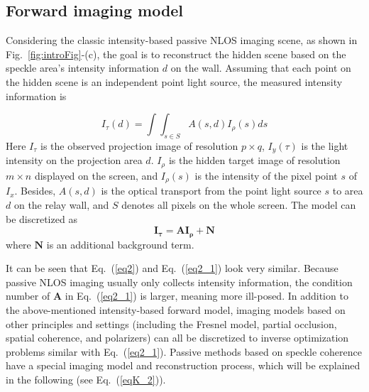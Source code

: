 \subsection{Forward imaging model}
Considering the classic intensity-based passive NLOS imaging scene, as shown in Fig.~\ref{fig:introFig}-(c), the goal is to reconstruct the hidden scene based on the speckle area's intensity information $d$ on the wall. Assuming that each point on the hidden scene is an independent point light source, the measured intensity information is

\begin{equation}
   I_{\tau}(d)=\int\int_{s\in S} A(s,d)I_{\rho}(s)ds
\end{equation}
Here $ I_ {\tau}$ is the observed projection image of resolution $p\times q$, $I_{y}(\tau)$ is the light intensity on the projection area $d$. $ I_ {\rho}$ is the hidden target image of resolution $m \times n$ displayed on the screen, and $I_{\rho}(s)$ is the intensity of the pixel point $s$ of $I_x$. Besides, $A(s,d)$ is the optical transport from the point light source $s$ to area $d$ on the relay wall, and $S$ denotes all pixels on the whole screen. The model can be discretized as
\begin{equation}
   \mathbf{I_{\tau}} = \mathbf{A}\mathbf{I_{\rho}} + \mathbf{N}
   \label{eq2_1}
\end{equation}
where $\mathbf{N}$ is an additional background term.

It can be seen that Eq.~(\ref{eq2}) and Eq.~(\ref{eq2_1}) look very similar. Because passive NLOS imaging usually only collects intensity information, the condition number of $\mathbf{A}$ in Eq.~(\ref{eq2_1}) is larger, meaning more ill-posed. 
In addition to the above-mentioned intensity-based forward model, imaging models based on other principles and settings (including the Fresnel model\cite{beckusMultiModalNonLineofSightPassive2019}, partial occlusion\cite{saundersComputationalPeriscopyOrdinary2019,seidelTwoDimensionalNonLineofSightScene2020}, spatial coherence\cite{batarsehPassiveSensingCorner2018a,beckusMultiModalNonLineofSightPassive2019}, and polarizers\cite{tanakaPolarizedNonLineofSightImaging2020}) can all be discretized to inverse optimization problems similar with Eq.~(\ref{eq2_1}). 
Passive methods based on speckle coherence have a special imaging model and reconstruction process, which will be explained in the following (see Eq.~(\ref{eqK_2})).


